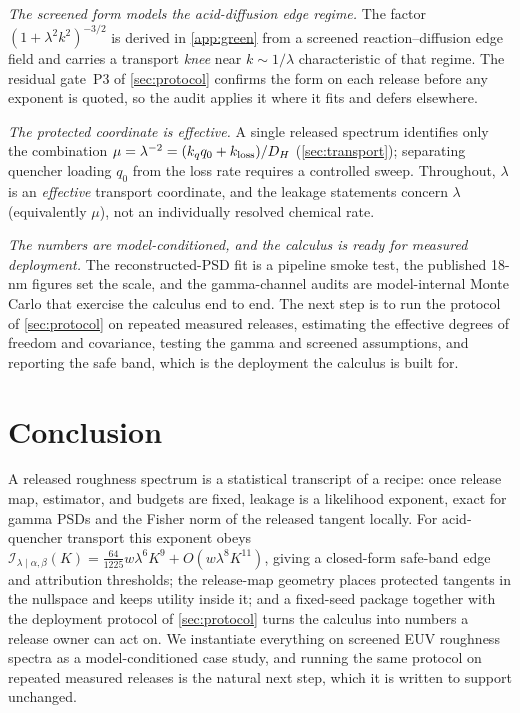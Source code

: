 \documentclass[11pt]{article}
\newcommand{\calI}{\mathcal I}
\begin{document}
\emph{The screened form models the acid-diffusion edge regime.} The factor \((1+\lambda^2k^2)^{-3/2}\) is derived in \cref{app:green} from a screened reaction--diffusion edge field and carries a transport \emph{knee} near \(k\sim1/\lambda\) characteristic of that regime. The residual gate~P3 of \cref{sec:protocol} confirms the form on each release before any exponent is quoted, so the audit applies it where it fits and defers elsewhere.

\emph{The protected coordinate is effective.} A single released spectrum identifies only the combination \(\mu=\lambda^{-2}=(k_qq_0+k_{\rm loss})/D_H\) (\cref{sec:transport}); separating quencher loading \(q_0\) from the loss rate requires a controlled sweep. Throughout, \(\lambda\) is an \emph{effective} transport coordinate, and the leakage statements concern \(\lambda\) (equivalently \(\mu\)), not an individually resolved chemical rate.

\emph{The numbers are model-conditioned, and the calculus is ready for measured deployment.} The reconstructed-PSD fit is a pipeline smoke test, the published 18-nm figures set the scale, and the gamma-channel audits are model-internal Monte Carlo that exercise the calculus end to end. The next step is to run the protocol of \cref{sec:protocol} on repeated measured releases, estimating the effective degrees of freedom and covariance, testing the gamma and screened assumptions, and reporting the safe band, which is the deployment the calculus is built for.

\section{Conclusion}

A released roughness spectrum is a statistical transcript of a recipe: once release map, estimator, and budgets are fixed, leakage is a likelihood exponent, exact for gamma PSDs and the Fisher norm of the released tangent locally. For acid-quencher transport this exponent obeys \(\calI_{\lambda\mid\alpha,\beta}(K)=\tfrac{64}{1225}w\lambda^6K^9+O(w\lambda^8K^{11})\), giving a closed-form safe-band edge and attribution thresholds; the release-map geometry places protected tangents in the nullspace and keeps utility inside it; and a fixed-seed package together with the deployment protocol of \cref{sec:protocol} turns the calculus into numbers a release owner can act on. We instantiate everything on screened EUV roughness spectra as a model-conditioned case study, and running the same protocol on repeated measured releases is the natural next step, which it is written to support unchanged.
\end{document}
